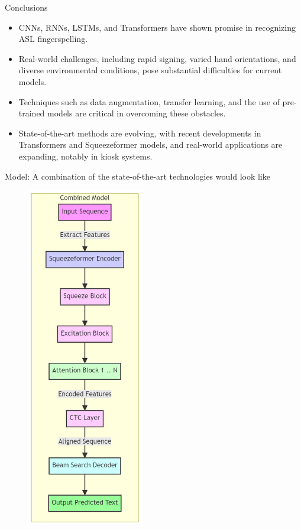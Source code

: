 \documentclass{beamer} %
\begin{document}
\begin{frame}[t]
\begin{columns}[t]
\begin{column}{0.3\textwidth}
			\begin{block}{Conclusions}
				\begin{minipage}{0.75\linewidth}
					\begin{itemize}
						\item CNNs, RNNs, LSTMs, and Transformers have shown promise in recognizing ASL fingerspelling.
						\item Real-world challenges, including rapid signing, varied hand orientations, and diverse environmental conditions, pose substantial difficulties for current models.
						\item Techniques such as data augmentation, transfer learning, and the use of pre-trained models are critical in overcoming these obstacles.
						\item State-of-the-art methods are evolving, with recent developments in Transformers and Squeezeformer models, and real-world applications are expanding, notably in kiosk systems.
					\end{itemize}
					\alert{Model}: A combination of the state-of-the-art technologies would look like
				\end{minipage}
				\hfill
				\begin{minipage}{0.24\linewidth}
					\begin{figure}
						\includegraphics[width=2in]{mermaid-diagram-conclusion.png}
					\end{figure}
				\end{minipage}
			\end{block}


\end{column}
\end{columns}
\end{frame}
\end{document}
